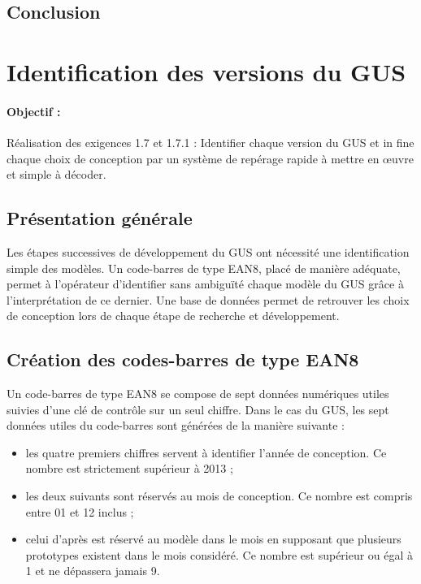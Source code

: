 \subsection{Conclusion}


\section{Identification des versions du GUS}

\paragraph{Objectif :} Réalisation des exigences 1.7 et 1.7.1 : Identifier chaque version du GUS et in fine chaque choix de conception par un système de repérage rapide à mettre en \oe uvre et simple à décoder.

\subsection{Présentation générale}

Les étapes successives de développement du GUS ont nécessité une identification simple des modèles. Un code-barres de type EAN8, placé de manière adéquate, permet à l'opérateur d'identifier sans ambiguïté chaque modèle du GUS grâce à l'interprétation de ce dernier. Une base de données permet de retrouver les choix de conception lors de chaque étape de recherche et développement.

\subsection{Création des codes-barres de type EAN8}

Un code-barres de type EAN8 se compose de sept données numériques utiles suivies d'une clé de contrôle sur un seul chiffre. Dans le cas du GUS, les sept données utiles du code-barres sont générées de la manière suivante :

\begin{itemize}
\item les quatre premiers chiffres servent à identifier l'année de conception. Ce nombre est strictement supérieur à 2013 ;
\item les deux suivants sont réservés au mois de conception. Ce nombre est compris entre 01 et 12 inclus ;
\item celui d'après est réservé au modèle dans le mois en supposant
que plusieurs prototypes existent dans le mois considéré. Ce
nombre est supérieur ou égal à 1 et ne dépassera jamais 9.
\end{itemize}

